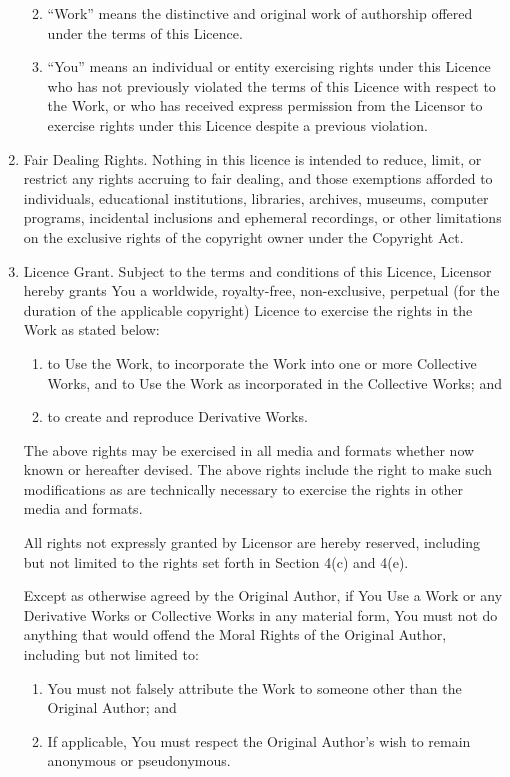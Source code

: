 \begin{enumerate}
\begin{enumerate}
\begin{enumerate}
		\end{enumerate}
         \item ``Work'' means the distinctive and original work of authorship offered under the terms of this Licence.
        \item ``You'' means an individual or entity exercising rights under this Licence who has not previously violated the terms of this Licence with respect to the Work, or who has received express permission from the Licensor to exercise rights under this Licence despite a previous violation.
	\end{enumerate}
   \item Fair Dealing Rights. Nothing in this licence is intended to reduce, limit, or restrict any rights accruing to fair dealing, and those exemptions afforded to individuals, educational institutions, libraries, archives, museums, computer programs, incidental inclusions and ephemeral recordings, or \linebreak other limitations on the exclusive rights of the copyright owner under the Copyright Act.
   \item Licence Grant. Subject to the terms and conditions of this Licence, Licensor hereby grants You a worldwide, royalty-free, non-exclusive, perpetual (for the duration of the applicable copyright) Licence to exercise the rights in the Work as stated below:
	\begin{enumerate}
        \item to Use the Work, to incorporate the Work into one or more Collective Works, and to Use the Work as incorporated in the Collective Works; and
         \item to create and reproduce Derivative Works.
	\end{enumerate}

      The above rights may be exercised in all media and formats whether now known or hereafter devised. The above rights include the right to make such modifications as are technically necessary to exercise the rights in other media and formats.

      All rights not expressly granted by Licensor are hereby reserved, including but not limited to the rights set forth in Section 4(c) and 4(e).

      Except as otherwise agreed by the Original Author, if You Use a Work or any Derivative Works or Collective Works in any material form, You must not do anything that would offend the Moral Rights of the Original Author, including but not limited to:
	\begin{enumerate}
        \item You must not falsely attribute the Work to someone other than the Original Author; and
        \item If applicable, You must respect the Original Author's wish to remain anonymous or \linebreak pseudonymous.
	\end{enumerate}


\end{enumerate}
